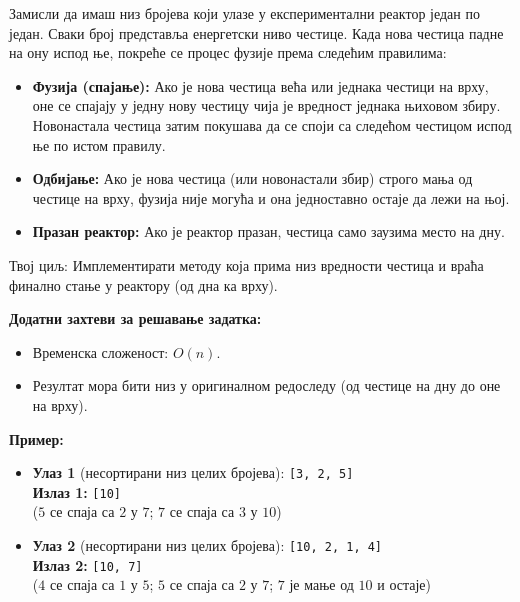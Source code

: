 Замисли да имаш низ бројева који улазе у експериментални реактор један по један. Сваки број представља енергетски ниво честице. Када нова честица падне на ону испод ње, покреће се процес фузије према следећим правилима:

\begin{itemize}
	\item \textbf{Фузија (спајање):} Ако је нова честица већа или једнака честици на врху, оне се спајају у једну нову честицу чија је вредност једнака њиховом збиру. Новонастала честица затим покушава да се споји са следећом честицом испод ње по истом правилу.
	\item \textbf{Одбијање:} Ако је нова честица (или новонастали збир) строго мања од честице на врху, фузија није могућа и она једноставно остаје да лежи на њој.
	\item \textbf{Празан реактор:} Ако је реактор празан, честица само заузима место на дну.
\end{itemize}

Твој циљ: Имплементирати методу која прима низ вредности честица и враћа финално стање у реактору (од дна ка врху).

\textbf{Додатни захтеви за решавање задатка:}
\begin{itemize}
	\item Временска сложеност: $O(n)$.
	\item Резултат мора бити низ у оригиналном редоследу (од честице на дну до оне на врху).
\end{itemize}

\textbf{Пример:}
\begin{itemize}
	\item \textbf{Улаз 1} (несортирани низ целих бројева): \texttt{[3, 2, 5]} \\
	      \textbf{Излаз 1:} \texttt{[10]} \\
	      ($5$ се спаја са $2$ у $7$; $7$ се спаја са $3$ у $10$)
	\item \textbf{Улаз 2} (несортирани низ целих бројева): \texttt{[10, 2, 1, 4]} \\
	      \textbf{Излаз 2:} \texttt{[10, 7]} \\
	      ($4$ се спаја са $1$ у $5$; $5$ се спаја са $2$ у $7$; $7$ је мање од $10$ и остаје)
\end{itemize}


